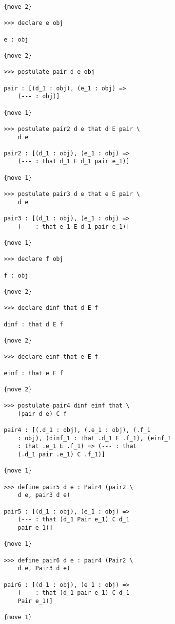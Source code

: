 \documentclass[12pt]{article}
\begin{document}
\begin{enumerate}
\begin{verbatim}
      {move 2}

      >>> declare e obj

      e : obj

      {move 2}

      >>> postulate pair d e obj

      pair : [(d_1 : obj), (e_1 : obj) => 
          (--- : obj)]

      {move 1}

      >>> postulate pair2 d e that d E pair \
          d e

      pair2 : [(d_1 : obj), (e_1 : obj) => 
          (--- : that d_1 E d_1 pair e_1)]

      {move 1}

      >>> postulate pair3 d e that e E pair \
          d e

      pair3 : [(d_1 : obj), (e_1 : obj) => 
          (--- : that e_1 E d_1 pair e_1)]

      {move 1}

      >>> declare f obj

      f : obj

      {move 2}

      >>> declare dinf that d E f

      dinf : that d E f

      {move 2}

      >>> declare einf that e E f

      einf : that e E f

      {move 2}

      >>> postulate pair4 dinf einf that \
          (pair d e) C f

      pair4 : [(.d_1 : obj), (.e_1 : obj), (.f_1 
          : obj), (dinf_1 : that .d_1 E .f_1), (einf_1 
          : that .e_1 E .f_1) => (--- : that 
          (.d_1 pair .e_1) C .f_1)]

      {move 1}

      >>> define pair5 d e : Pair4 (pair2 \
          d e, pair3 d e)

      pair5 : [(d_1 : obj), (e_1 : obj) => 
          (--- : that (d_1 Pair e_1) C d_1 
          pair e_1)]

      {move 1}

      >>> define pair6 d e : pair4 (Pair2 \
          d e, Pair3 d e)

      pair6 : [(d_1 : obj), (e_1 : obj) => 
          (--- : that (d_1 pair e_1) C d_1 
          Pair e_1)]

      {move 1}


\end{verbatim}
\end{enumerate}
\end{document}
